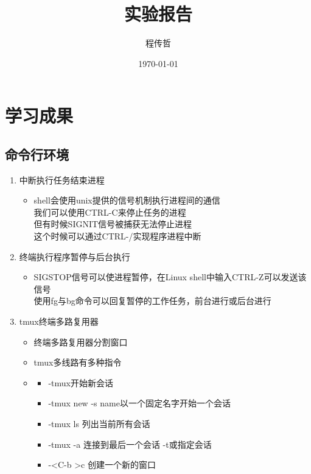 \documentclass[a4paper, 12pt]{article}
\begin{document}
    {\huge\title{实验报告}}
    {\large\author{程传哲}}
    \date{\today}
    \maketitle
\section{学习成果}

\subsection{命令行环境}
\begin{enumerate}
  \item {\large 中断执行任务结束进程} 
    \begin{itemize}
      \item 
      shell会使用unix提供的信号机制执行进程间的通信 \\
      我们可以使用CTRL-C来停止任务的进程\\
      但有时候SIGNIT信号被捕获无法停止进程\\
      这个时候可以通过CTRL-/实现程序进程中断
    \end{itemize}
  \item {\large 终端执行程序暂停与后台执行}
    \begin{itemize}
      \item 
      SIGSTOP信号可以使进程暂停，在Linux shell中输入CTRL-Z可以发送该信号 \\
      使用fg与bg命令可以回复暂停的工作任务，前台进行或后台进行 \\
    \end{itemize}
  \item {\large tmux终端多路复用器}
    \begin{itemize}
      \item 终端多路复用器分割窗口
      \item tmux多线路有多种指令
      \item {}
        \begin{itemize}
            \item -tmux开始新会话
            \item -tmux new -s name以一个固定名字开始一个会话
            \item -tmux ls 列出当前所有会话
            \item -tmux -a 连接到最后一个会话 -t或指定会话
            \item -\textless C-b \textgreater c 创建一个新的窗口

\end{itemize}
\end{itemize}
\end{enumerate}
\end{document}
